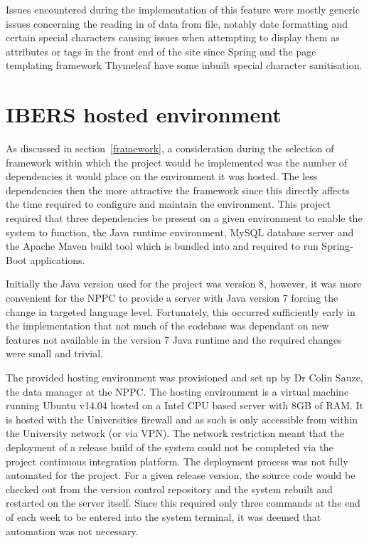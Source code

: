 \lstjava


Issues encountered during the implementation of this feature were mostly generic issues concerning the reading in of data from file, notably date formatting and certain special characters causing issues when attempting to display them as attributes or tags in the front end of the site since Spring and the page templating framework Thymeleaf have some inbuilt special character sanitisation.
\section{IBERS hosted environment}\label{hosting}

As discussed in section~\ref{framework}, a consideration during the selection of framework within which the project would be implemented was the number of dependencies it would place on the environment it was hosted. The less dependencies then the more attractive the framework since this directly affects the time required to configure and maintain the environment. This project required that three dependencies be present on a given environment to enable the system to function, the Java runtime environment, MySQL database server and the Apache Maven build tool which is bundled into and required to run Spring-Boot applications. 

Initially the Java version used for the project was version 8, however, it was more convenient for the NPPC to provide a server with Java version 7 forcing the change in targeted language level. Fortunately, this occurred sufficiently early in the implementation that not much of the codebase was dependant on new features not available in the version 7 Java runtime and the required changes were small and trivial.

The provided hosting environment was provisioned and set up by Dr Colin Sauze, the data manager at the NPPC. The hosting environment is a virtual machine running Ubuntu v14.04 hosted on a Intel CPU based server with 8GB of RAM. It is hosted with the Universities firewall and as such is only accessible from within the University network (or via VPN). The network restriction meant that the deployment of a release build of the system could not be completed via the project continuous integration platform. 
The deployment process was not fully automated for the project. For a given release version, the source code would be checked out from the version control repository and the system rebuilt and restarted on the server itself. Since this required only three commands at the end of each week to be entered into the system terminal, it was deemed that automation was not necessary.
